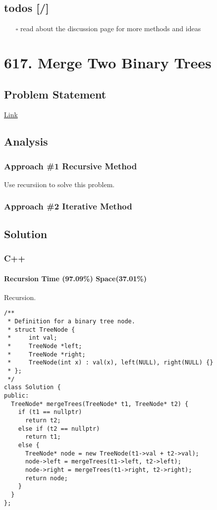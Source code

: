 \documentclass[12pt]{book}
\begin{document}
\section{todos [/]}
\label{sec:org45e577f}
\begin{itemize}
\item[{$\square$}] read about the discussion page for more methods and ideas
\end{itemize}

\chapter{617. Merge Two Binary Trees}
\label{sec:org852d889}
\section{Problem Statement}
\label{sec:org1d743e2}
\href{https://leetcode.com/problems/merge-two-binary-trees/}{Link}
\section{Analysis}
\label{sec:org423c79e}
\subsection{Approach \#1 Recursive Method}
\label{sec:org0e393f2}
Use recursiion to solve this problem.
\subsection{Approach \#2 Iterative Method}
\label{sec:orgbe2dd8d}

\section{Solution}
\label{sec:org7bfa85c}
\subsection{C++}
\label{sec:org96d87c3}
\subsubsection{Recursion Time (97.09\%) Space(37.01\%)}
\label{sec:org24c0f49}
Recursion.
\begin{verbatim}
/**
 * Definition for a binary tree node.
 * struct TreeNode {
 *     int val;
 *     TreeNode *left;
 *     TreeNode *right;
 *     TreeNode(int x) : val(x), left(NULL), right(NULL) {}
 * };
 */
class Solution {
public:
  TreeNode* mergeTrees(TreeNode* t1, TreeNode* t2) {
    if (t1 == nullptr)
      return t2;
    else if (t2 == nullptr)
      return t1;
    else {
      TreeNode* node = new TreeNode(t1->val + t2->val);
      node->left = mergeTrees(t1->left, t2->left);
      node->right = mergeTrees(t1->right, t2->right);
      return node;
    }
  }
};
\end{verbatim}
\end{document}
